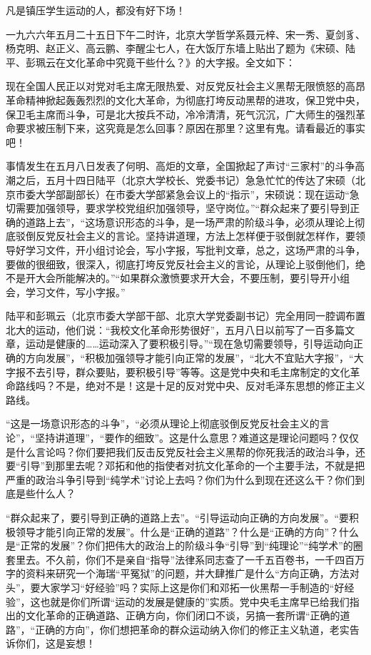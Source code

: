 凡是镇压学生运动的人，都没有好下场！

\begin{maonote}
一九六六年五月二十五日下午二时许，北京大学哲学系聂元梓、宋一秀、夏剑豸、杨克明、赵正义、高云鹏、李醒尘七人，在大饭厅东墙上贴出了题为《宋硕、陆平、彭珮云在文化革命中究竟干些什么？》的大字报。全文如下：

现在全国人民正以对党对毛主席无限热爱、对反党反社会主义黑帮无限愤怒的高昂革命精神掀起轰轰烈烈的文化大革命，为彻底打垮反动黑帮的进攻，保卫党中央，保卫毛主席而斗争，可是北大按兵不动，冷冷清清，死气沉沉，广大师生的强烈革命要求被压制下来，这究竟是怎么回事？原因在那里？这里有鬼。请看最近的事实吧！

事情发生在五月八日发表了何明、高炬的文章，全国掀起了声讨“三家村”的斗争高潮之后，五月十四日陆平（北京大学校长、党委书记）急急忙忙的传达了宋硕（北京市委大学部副部长）在市委大学部紧急会议上的“指示”，宋硕说：现在运动“急切需要加强领导，要求学校党组织加强领导，坚守岗位。”“群众起来了要引导到正确的道路上去”，“这场意识形态的斗争，是一场严肃的阶级斗争，必须从理论上彻底驳倒反党反社会主义的言论。坚持讲道理，方法上怎样便于驳倒就怎样作，要领导好学习文件，开小组讨论会，写小字报，写批判文章，总之，这场严肃的斗争，要做的很细致，很深入，彻底打垮反党反社会主义的言论，从理论上驳倒他们，绝不是开大会所能解决的。”“如果群众激愤要求开大会，不要压制，要引导开小组会，学习文件，写小字报。”

陆平和彭珮云（北京市委大学部干部、北京大学党委副书记）完全用同一腔调布置北大的运动，他们说：“我校文化革命形势很好”，五月八日以前写了一百多篇文章，运动是健康的……运动深入了要积极引导。”“现在急切需要领导，引导运动向正确的方向发展”，“积极加强领导才能引向正常的发展”，“北大不宜贴大字报”，“大字报不去引导，群众要贴，要积极引导”等等。这是党中央和毛主席制定的文化革命路线吗？不是，绝对不是！这是十足的反对党中央、反对毛泽东思想的修正主义路线。

“这是一场意识形态的斗争”，“必须从理论上彻底驳倒反党反社会主义的言论”，“坚持讲道理”，“要作的细致”。这是什么意思？难道这是理论问题吗？仅仅是什么言论吗？你们要把我们反击反党反社会主义黑帮的你死我活的政治斗争，还要“引导”到那里去呢？邓拓和他的指使者对抗文化革命的一个主要手法，不就是把严重的政治斗争引导到“纯学术”讨论上去吗？你们为什么到现在还这么干？你们到底是些什么人？

“群众起来了，要引导到正确的道路上去”。“引导运动向正确的方向发展”。“要积极领导才能引向正常的发展”。什么是“正确的道路”？什么是“正确的方向”？什么是“正常的发展”？你们把伟大的政治上的阶级斗争“引导”到“纯理论”“纯学术”的圈套里去。不久前，你们不是亲自“指导”法律系同志查了一千五百卷书，一千四百万字的资料来研究一个海瑞“平冤狱”的问题，并大肆推广是什么“方向正确，方法对头”，要大家学习“好经验”吗？实际上这是你们和邓拓一伙黑帮一手制造的“好经验”，这也就是你们所谓“运动的发展是健康的”实质。党中央毛主席早已给我们指出的文化革命的正确道路、正确方向，你们闭口不谈，另搞一套所谓“正确的道路”，“正确的方向”，你们想把革命的群众运动纳入你们的修正主义轨道，老实告诉你们，这是妄想！


\end{maonote}
